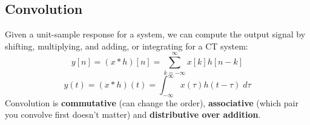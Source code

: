 \documentclass{article}
\begin{document}
\begin{multicols}{2}
\subsection{Convolution}
Given a unit-sample response for a system, we can compute the output signal by shifting, multiplying, and adding, or integrating for a CT system:
\[ y[n] = (x * h)[n] = \sum_{k=-\infty}^{\infty} x[k]h[n-k] \]
\[ y(t) = (x*h)(t) = \int_{-\infty}^{\infty}x(\tau)h(t-\tau)\; d\tau \]
Convolution is \textbf{commutative} (can change the order), \textbf{associative} (which pair you convolve first doesn't matter) and \textbf{distributive over addition}.
\end{multicols}
\end{document}
